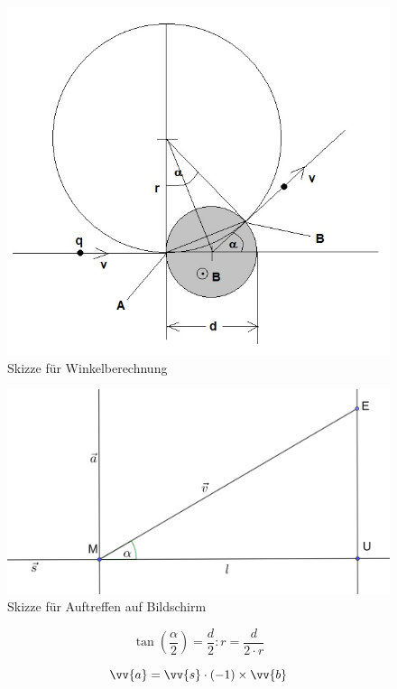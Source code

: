 \begin{figure}
    \centering
    \includegraphics[width=.75\textwidth]{fig/elektronenstrahl-ablenkung_101.jpg}
    \caption{Skizze für Winkelberechnung}
    \label{fig:ausBlog}
\end{figure}

\begin{figure}
    \centering
    \includegraphics[width=.75\textwidth]{fig/Bildschirm_Skizze.png}
    \caption{Skizze für Auftreffen auf Bildschirm}
    \label{fig:Schirm}
\end{figure}

\begin{equation}
    \label{eq:tan}
    \tan(\frac{\alpha}{2}) = \frac{d}{2}:r = \frac{d}{2 \cdot r}
\end{equation}

\begin{equation}
    \label{eq:a}
    \vv{a} = \vv{s} \cdot (-1) \times \vv{b}
\end{equation}

